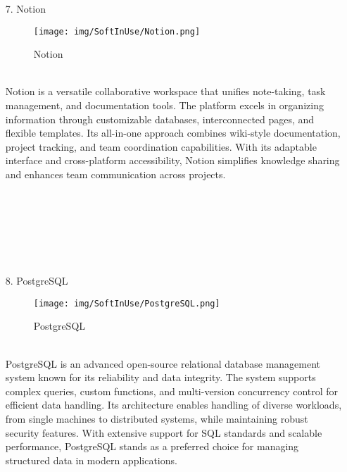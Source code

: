 \documentclass[conference]{IEEEtran}
\begin{document}
\begin{enumerate}
\item[7.] Notion
\begin{figure}[h]
\hspace{1.5cm}
\centering
\begin{minipage}{0.4\columnwidth}
    \texttt{[image: img/SoftInUse/Notion.png]}
    \caption{Notion}
\end{minipage}
\end{figure}\\
Notion is a versatile collaborative workspace that unifies note-taking, task management, and documentation tools. The platform excels in organizing information through customizable databases, interconnected pages, and flexible templates. Its all-in-one approach combines wiki-style documentation, project tracking, and team coordination capabilities. With its adaptable interface and cross-platform accessibility, Notion simplifies knowledge sharing and enhances team communication across projects.\\ \\ \\ \\ \\ \\ \\

\item[8.] PostgreSQL
\begin{figure}[h]
\hspace{1.5cm}
\centering
\begin{minipage}{0.4\columnwidth}
    \texttt{[image: img/SoftInUse/PostgreSQL.png]}
    \caption{PostgreSQL}
\end{minipage}
\end{figure}\\
PostgreSQL is an advanced open-source relational database management system known for its reliability and data integrity. The system supports complex queries, custom functions, and multi-version concurrency control for efficient data handling. Its architecture enables handling of diverse workloads, from single machines to distributed systems, while maintaining robust security features. With extensive support for SQL standards and scalable performance, PostgreSQL stands as a preferred choice for managing structured data in modern applications.\\


\end{enumerate}
\end{document}
